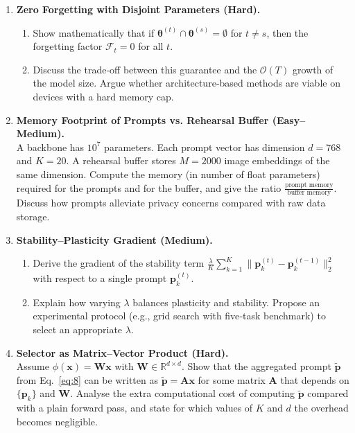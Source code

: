 \documentclass[12pt, a4paper]{article}
\begin{document}
\begin{enumerate}
  \item \textbf{Zero Forgetting with Disjoint Parameters (Hard).}\\
  \begin{enumerate}
    \item Show mathematically that if $\boldsymbol\theta^{(t)}\cap\boldsymbol\theta^{(s)}=\emptyset$ for $t\neq s$, then the forgetting factor $\mathcal F_{t}=0$ for all $t$.
    \item Discuss the trade‑off between this guarantee and the $\mathcal O(T)$ growth of the model size. Argue whether architecture‑based methods are viable on devices with a hard memory cap.
  \end{enumerate}

  \item \textbf{Memory Footprint of Prompts vs. Rehearsal Buffer (Easy–Medium).}\\
  A backbone has $10^{7}$ parameters. Each prompt vector has dimension $d=768$ and $K=20$. A rehearsal buffer stores $M=2000$ image embeddings of the same dimension. Compute the memory (in number of float parameters) required for the prompts and for the buffer, and give the ratio $\frac{\text{prompt memory}}{\text{buffer memory}}$. Discuss how prompts alleviate privacy concerns compared with raw data storage.

  \item \textbf{Stability–Plasticity Gradient (Medium).}\\
  \begin{enumerate}
    \item Derive the gradient of the stability term $\frac{\lambda}{K}\sum_{k=1}^{K}\|\mathbf p_{k}^{(t)}-\mathbf p_{k}^{(t-1)}\|_{2}^{2}$ with respect to a single prompt $\mathbf p_{k}^{(t)}$.
    \item Explain how varying $\lambda$ balances plasticity and stability. Propose an experimental protocol (e.g., grid search with five‑task benchmark) to select an appropriate $\lambda$.
  \end{enumerate}

  \item \textbf{Selector as Matrix–Vector Product (Hard).}\\
  Assume $\phi(\mathbf x)=\mathbf W\mathbf x$ with $\mathbf W\in\mathbb R^{d\times d}$. Show that the aggregated prompt $\tilde{\mathbf p}$ from Eq.~\eqref{eq:8} can be written as $\tilde{\mathbf p}= \mathbf A\mathbf x$ for some matrix $\mathbf A$ that depends on $\{\mathbf p_{k}\}$ and $\mathbf W$. Analyse the extra computational cost of computing $\tilde{\mathbf p}$ compared with a plain forward pass, and state for which values of $K$ and $d$ the overhead becomes negligible.


\end{enumerate}
\end{document}
